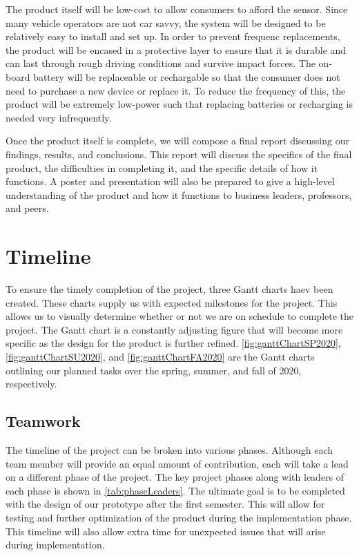 \documentclass[11pt]{IEEEtran}
\begin{document}
		The product itself will be low-cost to allow consumers to afford the sensor. Since many vehicle operators are not car savvy, the system will be designed to be relatively easy to install and set up. In order to prevent frequenc replacements, the product will be encased in a protective layer to ensure that it is durable and can last through rough driving conditions and survive impact forces. The on-board battery will be replaceable or rechargable so that the consumer does not need to purchase a new device or replace it. To reduce the frequency of this, the product will be extremely low-power such that replacing batteries or recharging is needed very infrequently.

		Once the product itself is complete, we will compose a final report discussing our findings, results, and conclusions. This report will discuss the specifics of the final product, the difficulties in completing it, and the specific details of how it functions. A poster and presentation will also be prepared to give a high-level understanding of the product and how it functions to business leaders, professors, and peers. 

	\section{Timeline}
		To ensure the timely completion of the project, three Gantt charts haev been created. These charts supply us with expected milestones for the project. This allows us to visually determine whether or not we are on schedule to complete the project. The Gantt chart is a constantly adjusting figure that will become more specific as the design for the product is further refined. \autoref{fig:ganttChartSP2020}, \autoref{fig:ganttChartSU2020}, and \autoref{fig:ganttChartFA2020} are the Gantt charts outlining our planned tasks over the spring, summer, and fall of 2020, respectively. 

		\subsection{Teamwork}
			The timeline of the project can be broken into various phases. Although each team member will provide an equal amount of contribution, each will take a lead on a different phase of the project. The key project phases along with leaders of each phase is shown in \autoref{tab:phaseLeaders}. The ultimate goal is to be completed with the design of our prototype after the first semester. This will allow for testing and further optimization of the product during the implementation phase. This timeline will also allow extra time for unexpected issues that will arise during implementation. 
\end{document}
